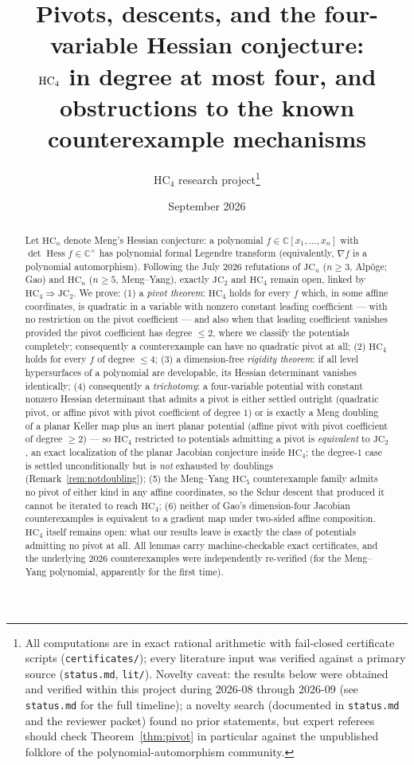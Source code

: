 \documentclass[11pt]{article}
\title{Pivots, descents, and the four-variable Hessian conjecture:\\
$\HC_4$ in degree at most four, and obstructions to the known
counterexample mechanisms}
\author{HC$_4$ research project\thanks{All computations are in exact
rational arithmetic with fail-closed certificate scripts
(\texttt{certificates/}); every literature input was verified against a
primary source (\texttt{status.md}, \texttt{lit/}). Novelty caveat: the
results below were obtained and verified within this project during
2026-08 through 2026-09 (see \texttt{status.md} for the full timeline); a
novelty search (documented in \texttt{status.md} and the
reviewer packet) found no prior statements, but expert referees should
check Theorem~\ref{thm:pivot} in particular against the unpublished
folklore of the polynomial-automorphism community.}}
\date{September 2026}
\theoremstyle{plain}
\theoremstyle{definition}
\newcommand{\C}{\mathbb{C}}
\newcommand{\Hess}{\operatorname{Hess}}
\newcommand{\HC}{\mathrm{HC}}
\newcommand{\JC}{\mathrm{JC}}
\begin{document}
\maketitle

\begin{abstract}
Let $\HC_n$ denote Meng's Hessian conjecture: a polynomial
$f\in\C[x_1,\dots,x_n]$ with $\det\Hess f\in\C^\times$ has polynomial
formal Legendre transform (equivalently, $\nabla f$ is a polynomial
automorphism). Following the July 2026 refutations of $\JC_n$ ($n\ge3$,
Alp\"oge; Gao) and $\HC_n$ ($n\ge5$, Meng--Yang), exactly $\JC_2$ and
$\HC_4$ remain open, linked by $\HC_4\Rightarrow\JC_2$. We prove:
(1) a \emph{pivot theorem}: $\HC_4$ holds for every $f$ which, in some
affine coordinates, is quadratic in a variable with nonzero constant
leading coefficient --- with no restriction on the pivot coefficient ---
and also when that leading coefficient vanishes provided the pivot
coefficient has degree $\le2$, where we classify the potentials completely;
consequently a counterexample can have no quadratic pivot at all;
(2) $\HC_4$ holds for every $f$ of degree $\le4$;
(3) a dimension-free \emph{rigidity theorem}: if all level hypersurfaces of
a polynomial are developable, its Hessian determinant vanishes identically;
(4) consequently a \emph{trichotomy}: a four-variable potential with
constant nonzero Hessian determinant that admits a pivot is either settled
outright (quadratic pivot, or affine pivot with pivot coefficient of
degree $1$) or is exactly a Meng doubling of a planar Keller map plus an
inert planar potential (affine pivot with pivot coefficient of degree
$\ge2$) --- so $\HC_4$ restricted to potentials admitting a pivot is
\emph{equivalent} to $\JC_2$, an exact localization of the planar Jacobian
conjecture inside $\HC_4$; the degree-$1$ case is settled unconditionally
but is \emph{not} exhausted by doublings (Remark~\ref{rem:notdoubling});
(5) the Meng--Yang $\HC_5$ counterexample family admits no pivot of either
kind in any affine coordinates, so the Schur descent that produced it
cannot be iterated to reach $\HC_4$;
(6) neither of Gao's dimension-four Jacobian counterexamples is equivalent
to a gradient map under two-sided affine composition.
$\HC_4$ itself remains open: what our results leave is exactly the class of
potentials admitting no pivot at all.
All lemmas carry machine-checkable exact certificates, and the underlying
2026 counterexamples were independently re-verified (for the Meng--Yang
polynomial, apparently for the first time).
\end{abstract}
\end{document}
